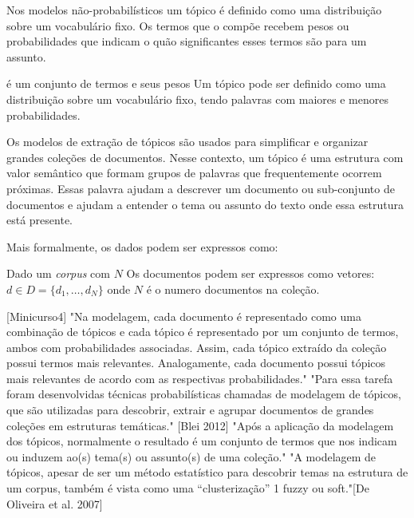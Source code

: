 

Nos modelos não-probabilísticos um tópico é definido como uma distribuição sobre um vocabulário fixo. Os termos que o compõe recebem pesos ou probabilidades que indicam o quão significantes esses termos são para um assunto.



é um conjunto de termos e seus pesos 
Um tópico pode ser definido como uma distribuição sobre um vocabulário fixo, tendo palavras com maiores e menores probabilidades.

Os modelos de extração de tópicos são usados para simplificar e organizar grandes coleções de documentos. Nesse contexto, um tópico é uma estrutura com valor semântico que formam grupos de palavras que frequentemente ocorrem próximas. Essas palavra ajudam a descrever um documento ou sub-conjunto de documentos e ajudam a entender o tema ou assunto do texto onde essa estrutura está presente.


Mais formalmente, os dados podem ser expressos como:

Dado um \textit{corpus} com $N$ 
Os documentos podem ser expressos como vetores: $ d \in D = \{d_1,\dots,d_N\}$ onde $N$ é o numero documentos na coleção. 



[Minicurso4] 
"Na modelagem, cada documento é representado como uma combinação de tópicos e cada tópico é representado por um conjunto de termos, ambos com probabilidades associadas. Assim, cada tópico extraído da coleção possui termos mais relevantes. Analogamente, cada documento possui tópicos mais relevantes de acordo com as respectivas probabilidades."
"Para essa tarefa foram desenvolvidas técnicas probabilísticas chamadas de modelagem de tópicos, que são utilizadas para descobrir, extrair e agrupar documentos de grandes coleções em estruturas temáticas." [Blei 2012]
"Após a aplicação da modelagem dos tópicos, normalmente o resultado é um conjunto de termos que nos indicam ou induzem ao(s) tema(s) ou assunto(s) de uma coleção."
"A modelagem de tópicos, apesar de ser um método estatístico para descobrir temas na estrutura de um corpus, também é vista como uma “clusterização” 1 fuzzy ou soft."[De Oliveira et al. 2007]

